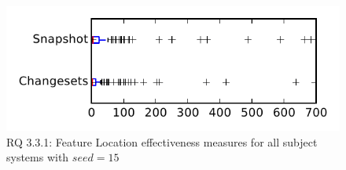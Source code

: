 
\begin{figure}
\centering
\includegraphics[height=0.4\textheight]{figures/flt_seed/rq1_tiny_15}
\caption{RQ 3.3.1: Feature Location effectiveness measures for all subject systems with $seed=15$}
\label{fig:flt_seed:rq1:tiny}
\end{figure}
